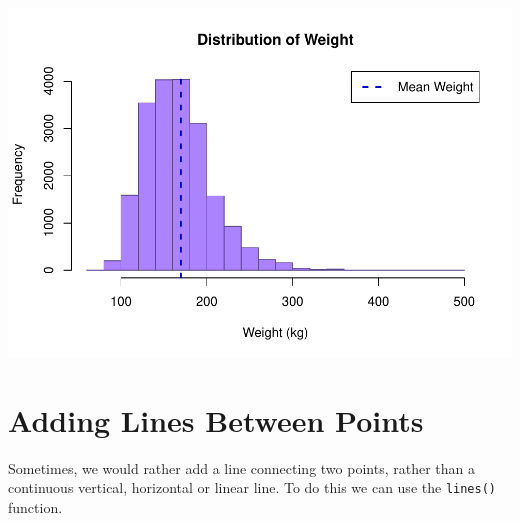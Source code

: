\documentclass[
]{book}
\newenvironment{Shaded}{\begin{snugshade}}{\end{snugshade}}
\newcommand{\CommentTok}[1]{\textcolor[rgb]{0.56,0.35,0.01}{\textit{#1}}}
\newcommand{\DataTypeTok}[1]{\textcolor[rgb]{0.13,0.29,0.53}{#1}}
\newcommand{\DecValTok}[1]{\textcolor[rgb]{0.00,0.00,0.81}{#1}}
\newcommand{\KeywordTok}[1]{\textcolor[rgb]{0.13,0.29,0.53}{\textbf{#1}}}
\newcommand{\NormalTok}[1]{#1}
\newcommand{\OperatorTok}[1]{\textcolor[rgb]{0.81,0.36,0.00}{\textbf{#1}}}
\newcommand{\StringTok}[1]{\textcolor[rgb]{0.31,0.60,0.02}{#1}}
\begin{document}
\begin{Shaded}
\end{Shaded}

\includegraphics{_main_files/figure-latex/unnamed-chunk-240-1.pdf}

\hypertarget{adding-lines-between-points}{%
\section{Adding Lines Between Points}\label{adding-lines-between-points}}

Sometimes, we would rather add a line connecting two points, rather than a continuous vertical, horizontal or linear line. To do this we can use the \texttt{lines()} function.
\end{document}
